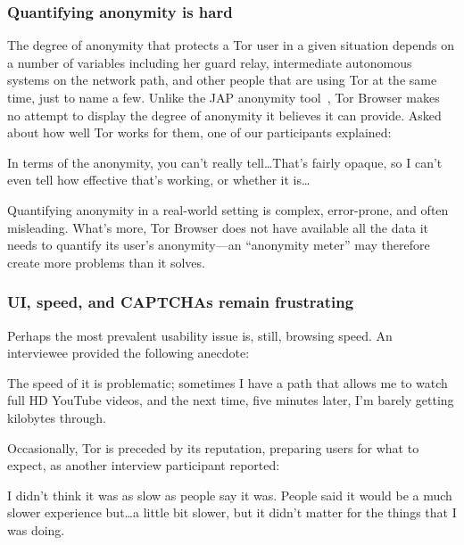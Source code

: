 \subsubsection{Quantifying anonymity is hard}

The degree of anonymity that protects a Tor user in a given situation depends on
a number of variables including her guard relay, intermediate autonomous systems
on the network path, and other people that are using Tor at the same time, just
to name a few.  Unlike the JAP anonymity tool~\cite{jap}, Tor Browser makes no
attempt to display the degree of anonymity it believes it can provide.  Asked
about how well Tor works for them, one of our participants explained:

\begin{displayquote}[P12]
In terms of the anonymity, you can't really tell\dots That's fairly opaque, so I
can't even tell how effective that's working, or whether it is\dots
\end{displayquote}

Quantifying anonymity in a real-world setting is complex, error-prone, and often
misleading.  What's more, Tor Browser does not have available all the data it
needs to quantify its user's anonymity---an ``anonymity meter'' may therefore
create more problems than it solves.

\subsubsection{UI, speed, and CAPTCHAs remain frustrating}

Perhaps the most prevalent usability issue is, still, browsing speed.  An
interviewee provided the following anecdote:

\begin{displayquote}[P01]
The speed of it is problematic; sometimes I have a path that allows me to watch
full HD YouTube videos, and the next time, five minutes later, I'm barely
getting kilobytes through.
\end{displayquote}

Occasionally, Tor is preceded by its reputation, preparing users for what to
expect, as another interview participant reported:

\begin{displayquote}[P03]
I didn't think it was as slow as people say it was. People said it would be a
much slower experience but\ldots a little bit slower, but it didn't matter for
the things that I was doing.
\end{displayquote}

